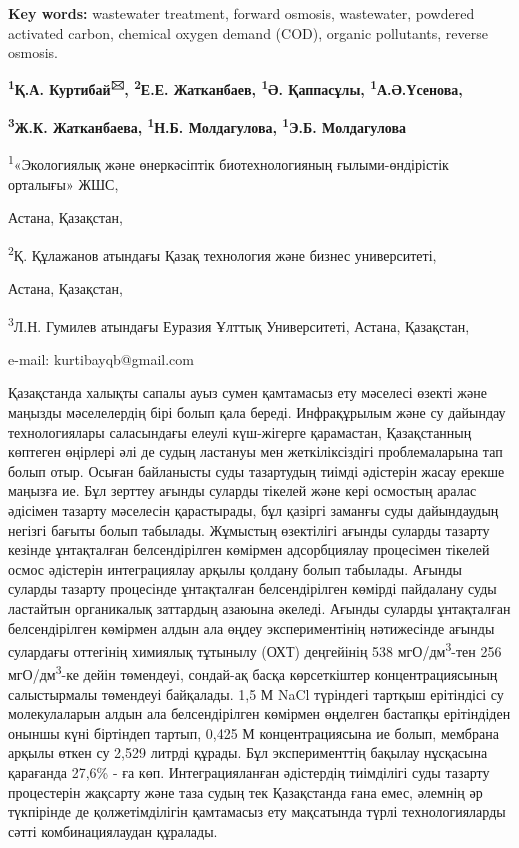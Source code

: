 {\bfseries Key words:} wastewater treatment, forward osmosis, wastewater,
powdered activated carbon, chemical oxygen demand (COD), organic
pollutants, reverse osmosis.


\begin{center}
{\bfseries \textsuperscript{1}Қ.А. Куртибай\textsuperscript{🖂},
\textsuperscript{2}Е.Е. Жатканбаев, \textsuperscript{1}Ә. Қаппасұлы,
\textsuperscript{1}А.Ә.Үсенова,}

{\bfseries \textsuperscript{3}Ж.К. Жатканбаева, \textsuperscript{1}Н.Б.
Молдагулова, \textsuperscript{1}Э.Б. Молдагулова}

\textsuperscript{1}«Экологиялық және өнеркәсіптік биотехнологияның
ғылыми-өндірістік орталығы» ЖШС,

Астана, Қазақстан,

\textsuperscript{2}Қ. Құлажанов атындағы Қазақ технология және бизнес
университеті,

Астана, Қазақстан,

\textsuperscript{3}Л.Н. Гумилев атындағы Еуразия Ұлттық Университеті,
Астана, Қазақстан,

e-mail: kurtibayqb@gmail.com
\end{center}

Қазақстанда халықты сапалы ауыз сумен қамтамасыз ету мәселесі өзекті
және маңызды мәселелердің бірі болып қала береді. Инфрақұрылым және су
дайындау технологиялары саласындағы елеулі күш-жігерге қарамастан,
Қазақстанның көптеген өңірлері әлі де судың ластануы мен жеткіліксіздігі
проблемаларына тап болып отыр. Осыған байланысты суды тазартудың тиімді
әдістерін жасау ерекше маңызға ие. Бұл зерттеу ағынды суларды тікелей
және кері осмостың аралас әдісімен тазарту мәселесін қарастырады, бұл
қазіргі заманғы суды дайындаудың негізгі бағыты болып табылады. Жұмыстың
өзектілігі ағынды суларды тазарту кезінде ұнтақталған белсендірілген
көмірмен адсорбциялау процесімен тікелей осмос әдістерін интеграциялау
арқылы қолдану болып табылады. Ағынды суларды тазарту процесінде
ұнтақталған белсендірілген көмірді пайдалану суды ластайтын органикалық
заттардың азаюына әкеледі. Ағынды суларды ұнтақталған белсендірілген
көмірмен алдын ала өңдеу экспериментінің нәтижесінде ағынды сулардағы
оттегінің химиялық тұтынылу (ОХТ) деңгейінің 538
мгО/дм\textsuperscript{3}-тен 256 мгО/дм\textsuperscript{3}-ке дейін
төмендеуі, сондай-ақ басқа көрсеткіштер концентрациясының салыстырмалы
төмендеуі байқалады. 1,5 М NaCl түріндегі тартқыш ерітіндісі су
молекулаларын алдын ала белсендірілген көмірмен өңделген бастапқы
ерітіндіден оныншы күні біртіндеп тартып, 0,425 М концентрациясына ие
болып, мембрана арқылы өткен су 2,529 литрді құрады. Бұл эксперименттің
бақылау нұсқасына қарағанда 27,6\% - ға көп. Интеграцияланған әдістердің
тиімділігі суды тазарту процестерін жақсарту және таза судың тек
Қазақстанда ғана емес, әлемнің әр түкпірінде де қолжетімділігін
қамтамасыз ету мақсатында түрлі технологияларды сәтті комбинациялаудан
құралады.

